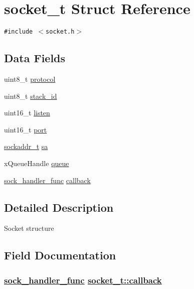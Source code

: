 \hypertarget{structsocket__t}{
\section{socket\_\-t Struct Reference}
\label{structsocket__t}
}
{\tt \#include $<$socket.h$>$}

\subsection*{Data Fields}
\begin{CompactItemize}
\item 
uint8\_\-t \hyperlink{structsocket__t_70368ea424aea352c4705a6c210949f7}{protocol}
\item 
uint8\_\-t \hyperlink{structsocket__t_ac1f42ef7ee07bed7f96631b4752dabb}{stack\_\-id}
\item 
uint16\_\-t \hyperlink{structsocket__t_367f8e34a0abb424055cc8fcb3388705}{listen}
\item 
uint16\_\-t \hyperlink{structsocket__t_584532d6d7f8a88d0b8e5b263dba7621}{port}
\item 
\hyperlink{structsockaddr__t}{sockaddr\_\-t} \hyperlink{structsocket__t_dd056ea6adc14e1cb056e3195ee540c2}{sa}
\item 
x\-Queue\-Handle \hyperlink{structsocket__t_6fdb7e88bf89a5bc524a576a7b2a2ac8}{queue}
\item 
\hyperlink{socket_8h_041daa666328e99aae40477895597d8d}{sock\_\-handler\_\-func} \hyperlink{structsocket__t_e9c15a340c51976f69a600d9e2b7b716}{callback}
\end{CompactItemize}


\subsection{Detailed Description}
Socket structure 



\subsection{Field Documentation}
\hypertarget{structsocket__t_e9c15a340c51976f69a600d9e2b7b716}{
\subsubsection[callback]{\setlength{\rightskip}{0pt plus 5cm}\hyperlink{socket_8h_041daa666328e99aae40477895597d8d}{sock\_\-handler\_\-func} \hyperlink{structsocket__t_e9c15a340c51976f69a600d9e2b7b716}{socket\_\-t::callback}}}
\label{structsocket__t_e9c15a340c51976f69a600d9e2b7b716}


